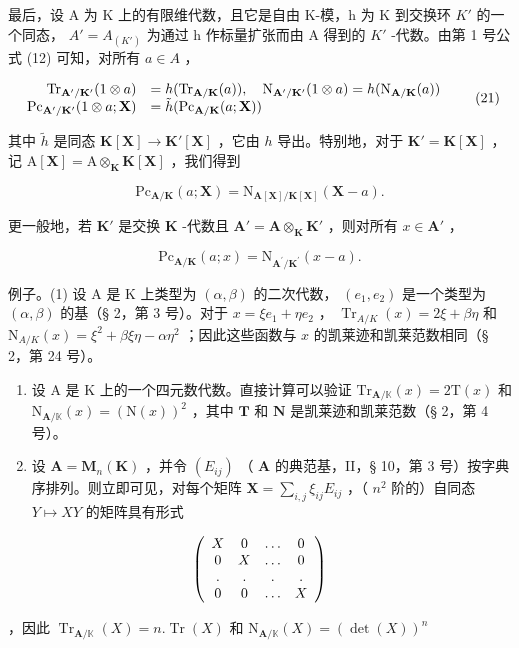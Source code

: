 最后，设 A 为 K 上的有限维代数，且它是自由 K-模，h 为 K 到交换环 \(K'\) 的一个同态， \(A' = A_{(K')}\) 为通过 h 作标量扩张而由 A 得到的 \(K'\) -代数。由第 1 号公式 (12) 可知，对所有 \(a \in A\) ，

\[
\begin{array}{r l} \mathrm{Tr} _ {\mathbf {A} ^ {\prime} / \mathbf {K} ^ {\prime}} (1 \otimes a) & = h (\mathrm{Tr} _ {\mathbf {A} / \mathbf {K}} (a)), \quad \mathrm{N} _ {\mathbf {A} ^ {\prime} / \mathbf {K} ^ {\prime}} (1 \otimes a) = h (\mathrm{N} _ {\mathbf {A} / \mathbf {K}} (a)) \\ \mathrm{Pc} _ {\mathbf {A} ^ {\prime} / \mathbf {K} ^ {\prime}} (1 \otimes a; \mathbf {X}) & = \tilde {h} (\mathrm{Pc} _ {\mathbf {A} / \mathbf {K}} (a; \mathbf {X})) \end{array}\tag{21}
\]

其中 \(\tilde{h}\) 是同态 \(\mathbf{K}[\mathbf{X}] \to \mathbf{K}'[\mathbf{X}]\) ，它由 \(h\) 导出。特别地，对于 \(\mathbf{K}' = \mathbf{K}[\mathbf{X}]\) ，记 \(\mathrm{A}[\mathbf{X}] = \mathrm{A} \otimes_{\mathbf{K}} \mathbf{K}[\mathbf{X}]\) ，我们得到

\[
\mathrm{Pc} _ {\mathbf {A} / \mathbf {K}} (a; \mathbf {X}) = \mathrm{N} _ {\mathbf {A} [ \mathbf {X} ] / \mathbf {K} [ \mathbf {X} ]} (\mathbf {X} - a).\tag{22}
\]

更一般地，若 \(\mathbf{K}'\) 是交换 \(\mathbf{K}\) -代数且 \(\mathbf{A}' = \mathbf{A} \otimes_{\mathbf{K}} \mathbf{K}'\) ，则对所有 \(x \in \mathbf{A}'\) ，

\[
\mathrm{Pc} _ {\mathbf {A} / \mathbf {K}} (a; x) = \mathrm{N} _ {\mathbf {A} ^ {\prime} / \mathbf {K} ^ {\prime}} (x - a).
\]

例子。(1) 设 A 是 K 上类型为 \((\alpha, \beta)\) 的二次代数， \((e_1, e_2)\) 是一个类型为 \((\alpha, \beta)\) 的基（§ 2，第 3 号）。对于 \(x = \xi e_1 + \eta e_2\) ， \(\operatorname{Tr}_{A/K}(x) = 2\xi + \beta \eta\) 和 \(\mathrm{N}_{A/K}(x) = \xi^2 + \beta \xi \eta - \alpha \eta^2\) ；因此这些函数与 \(x\) 的凯莱迹和凯莱范数相同（§ 2，第 24 号）。

\begin{enumerate}
\def\labelenumi{(\arabic{enumi})}
\setcounter{enumi}{1}
\item
  设 A 是 K 上的一个四元数代数。直接计算可以验证 \(\mathrm{Tr}_{\mathbf{A} / \mathbb{K}}(x) = 2\mathrm{T}(x)\) 和 \(\mathrm{N}_{\mathbf{A} / \mathbb{K}}(x) = (\mathrm{N}(x))^2\) ，其中 \(\mathbf{T}\) 和 \(\mathbf{N}\) 是凯莱迹和凯莱范数（§ 2，第 4 号）。
\item
  设 \(\mathbf{A} = \mathbf{M}_n(\mathbf{K})\) ，并令 \((E_{ij})\) （ \(\mathbf{A}\) 的典范基，II，§ 10，第 3 号）按字典序排列。则立即可见，对每个矩阵 \(\mathbf{X} = \sum_{i,j} \xi_{ij} E_{ij}\) ，（ \(n^2\) 阶的）自同态 \(Y \mapsto XY\) 的矩阵具有形式
\end{enumerate}

\[
\left( \begin{array}{c c c c} X & 0 & \ldots & 0 \\ 0 & X & \ldots & 0 \\ . & . & . & . \\ 0 & 0 & \ldots & X \end{array} \right)
\]

，因此 \(\operatorname{Tr}_{\mathbf{A} / \mathbb{K}}(X) = n.\operatorname{Tr}(X)\) 和 \(\mathrm{N}_{\mathbf{A} / \mathbb{K}}(X) = (\det (X))^n\)

